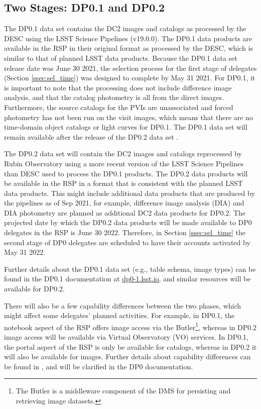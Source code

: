 \documentclass[DM,lsstdraft,authoryear,toc]{lsstdoc}
\begin{document}
\subsection{Two Stages: DP0.1 and DP0.2}\label{ssec:intro_stages}

The DP0.1 data set contains the DC2 images and catalogs as processed by the DESC using the LSST Science Pipelines (v19.0.0).
The DP0.1 data products are available in the RSP in their original format as processed by the DESC, which is similar to that of planned LSST data products.
Because the DP0.1 data set release date was June 30 2021, the selection process for the first stage of delegates (Section \ref{ssec:sel_time}) was designed to complete by May 31 2021.
For DP0.1, it is important to note that the processing does not include difference image analysis, and that the catalog photometry is all from the direct images.
Furthermore, the source catalogs for the PVIs are unassociated and forced photometry has not been run on the visit images, which means that there are no time-domain object catalogs or light curves for DP0.1.
The DP0.1 data set will remain available after the release of the DP0.2 data set .

The DP0.2 data set will contain the DC2 images and catalogs reprocessed by Rubin Observatory using a more recent version of the LSST Science Pipelines than DESC used to process the DP0.1 products.
The DP0.2 data products will be available in the RSP in a format that is consistent with the planned LSST data products.
This might include additional data products that are produced by the pipelines as of Sep 2021, for example, difference image analysis (DIA) and DIA photometry are planned as additional DC2 data products for DP0.2.
The projected date by which the DP0.2 data products will be made available to DP0 delegates in the RSP is June 30 2022. 
Therefore, in Section \ref{ssec:sel_time} the second stage of DP0 delegates are scheduled to have their accounts activated by May 31 2022.

Further details about the DP0.1 data set (e.g., table schema, image types) can be found in the DP0.1 documentation at \url{dp0-1.lsst.io}, and similar resources will be available for DP0.2.

There will also be a few capability differences between the two phases, which might affect some delegates' planned activities.
For example, in DP0.1, the notebook aspect of the RSP offers image access via the Butler\footnote{The Butler is a middleware component of the DMS for persisting and retrieving image datasets.}, whereas in DP0.2 image access will be available via Virtual Observatory (VO) services.
In DP0.1, the portal aspect of the RSP is only be available for catalogs, whereas in DP0.2 it will also be available for images.
Further details about capability differences can be found in , and will be clarified in the DP0 documentation.
\end{document}
